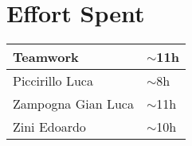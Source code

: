 \section{Effort Spent}
\begin{tabular}{| p{5cm} | p{5cm} |}
\hline
Teamwork & $\sim$11h\\
\hline
Piccirillo Luca & $\sim$8h\\
\hline
Zampogna Gian Luca & $\sim$11h\\
\hline
Zini Edoardo & $\sim$10h\\
\hline
\end{tabular}